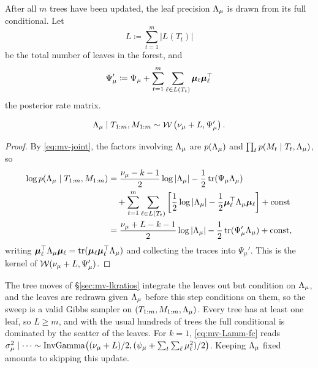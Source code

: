 After all $m$ trees have been updated, the leaf precision $\Lambda_{\mu}$ is drawn
from its full conditional. Let
\begin{equation}
	\label{eq:mv-Lamm-count}
	L \coloneqq \sum_{t=1}^m |L(T_t)|
\end{equation}
be the total number of leaves in the forest, and
\begin{equation}
	\label{eq:mv-Lamm-rate}
	\Psi_\mu' \coloneqq \Psi_\mu + \sum_{t=1}^m \sum_{\ell \in L(T_t)}
	\bm{\mu}_\ell \bm{\mu}_\ell^\top
\end{equation}
the posterior rate matrix.

\begin{prop}
	\label{prop:mv-Lamm}
	\begin{equation}
		\label{eq:mv-Lamm-fc}
		\Lambda_{\mu} \mid T_{1:m}, M_{1:m} \sim \mathcal{W}\left(\nu_\mu + L, \Psi_\mu'\right).
	\end{equation}
\end{prop}

\begin{proof}
	By \eqref{eq:mv-joint}, the factors involving $\Lambda_{\mu}$ are $p(\Lambda_{\mu})$
	and $\prod_t p(M_t \mid T_t, \Lambda_{\mu})$, so
	\begin{align}
		\log p(\Lambda_{\mu} \mid T_{1:m}, M_{1:m})
		 & = \frac{\nu_\mu - k - 1}{2}\log|\Lambda_{\mu}|
		- \frac{1}{2}\operatorname{tr}(\Psi_\mu \Lambda_{\mu})
		\\
		 & \quad + \sum_{t=1}^m \sum_{\ell \in L(T_t)} \left[
			\frac{1}{2}\log|\Lambda_{\mu}|
			- \frac{1}{2}\bm{\mu}_\ell^\top \Lambda_{\mu} \bm{\mu}_\ell
			\right] + \text{const}
		\notag \\
		 & = \frac{\nu_\mu + L - k - 1}{2}\log|\Lambda_{\mu}|
		- \frac{1}{2}\operatorname{tr}(\Psi_\mu' \Lambda_{\mu}) + \text{const},
	\end{align}
	writing $\bm{\mu}_\ell^\top \Lambda_{\mu} \bm{\mu}_\ell = \operatorname{tr}(\bm{\mu}_\ell \bm{\mu}_\ell^\top
		\Lambda_{\mu})$ and collecting the traces into $\Psi_\mu'$. This is the kernel
	of $\mathcal{W}(\nu_\mu + L, \Psi_\mu')$.
\end{proof}

The tree moves of \S\ref{sec:mv-lkratios} integrate the leaves out but
condition on $\Lambda_{\mu}$, and the leaves are redrawn given $\Lambda_{\mu}$ before this
step conditions on them, so the sweep is a valid Gibbs sampler on
$(T_{1:m}, M_{1:m}, \Lambda_{\mu})$. Every tree has at least one leaf, so
$L \ge m$, and with the usual hundreds of trees the full conditional is
dominated by the scatter of the leaves. For $k = 1$, \eqref{eq:mv-Lamm-fc}
reads $\sigma_\mu^{2} \mid \cdots \sim \mathrm{InvGamma}\bigl((\nu_\mu + L)/2, (\psi_\mu +
	\sum_t \sum_\ell \mu_\ell^2)/2\bigr)$. Keeping $\Lambda_{\mu}$ fixed amounts to
skipping this update.

